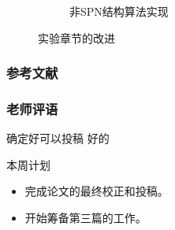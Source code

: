\documentclass{beamer}
\begin{document}
\begin{frame}
\begin{figure}[h]
\begin{subfigure}[b]{0.3\textwidth}
        \caption{非SPN结构算法实现}
        \label{fig:non_spn}
      \end{subfigure}
      \caption{实验章节的改进}
    \end{figure}
\end{frame}

\begin{frame}[allowframebreaks]
    \frametitle{参考文献}
    
\end{frame}

\begin{frame}
    \frametitle{老师评语}
    \begin{alertblock}{确定好可以投稿}
        好的
    \end{alertblock}

    \begin{block}{本周计划}
        \begin{itemize}
            \item 完成论文的最终校正和投稿。
            \item 开始筹备第三篇的工作。
        \end{itemize}
    \end{block}
\end{frame}
\end{document}

